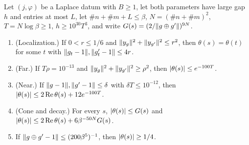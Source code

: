 \begin{proposition}\label{prop:A-cone}
Let $(j,\varphi)$ be a Laplace datum with $B\ge1$, let both parameters have large gap $h$ and entries at most $L$, let $\#n+\#m+L\le\beta$, $N=(\#n+\#m)^2$, $T=N\log\beta\ge1$, $h\ge10^{30}T^3$, and write $G(s)=(2/\lVert g\oplus g'\rVert)^{9N}$.
\begin{enumerate}[label=\textup{(\alph*)}]
\item (Localization.) If $0<r\le1/6$ and $\lVert y_g\rVert^2+\lVert y_{g'}\rVert^2\le r^2$, then $\theta(s)=\theta(t)$ for some $t$ with $\lVert g_t-1\rVert,\lVert g'_t-1\rVert\le4r$.
\item (Far.) If $T\rho=10^{-13}$ and $\lVert y_g\rVert^2+\lVert y_{g'}\rVert^2\ge\rho^2$, then $\lvert \theta(s)\rvert\le e^{-100T}$.
\item (Near.) If $\lVert g-1\rVert,\lVert g'-1\rVert\le\delta$ with $\delta T\le10^{-12}$, then $\lvert \theta(s)\rvert\le2\operatorname{Re}\theta(s)+12e^{-100T}$.
\item (Cone and decay.) For every $s$, $\lvert \theta(s)\rvert\le G(s)$ and $\lvert \theta(s)\rvert\le2\operatorname{Re}\theta(s)+6\beta^{-50N}G(s)$.
\item If $\lVert g\oplus g'-1\rVert\le(200\beta^5)^{-1}$, then $\lvert \theta(s)\rvert\ge1/4$.
\end{enumerate}
\end{proposition}

